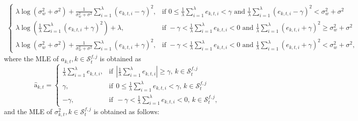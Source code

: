 \documentclass[onecolumn]{IEEEtran}
\begin{document}
\begin{align}
\begin{cases}
     \lambda \log(\sigma_w^2 + \sigma^2) + \frac{1}{\sigma_w^2 + \sigma^2} \sum_{i=1}^{\lambda} (e_{k,t,i} - \gamma)^2, & \mbox{if } 0 \leq \frac{1}{\lambda} \sum_{i=1}^{\lambda} e_{k,t,i} < \gamma \mbox{ and } \frac{1}{\lambda} \sum_{i=1}^{\lambda} (e_{k,t,i} - \gamma)^2 < \sigma_w^2 + \sigma^2 \\
     \lambda \log(\frac{1}{\lambda} \sum_{i=1}^{\lambda} (e_{k,t,i} + \gamma)^2) + \lambda, & \mbox{if } -\gamma < \frac{1}{\lambda} \sum_{i=1}^{\lambda} e_{k,t,i} < 0 \mbox{ and } \frac{1}{\lambda} \sum_{i=1}^{\lambda} (e_{k,t,i} + \gamma)^2 \geq \sigma_w^2 + \sigma^2 \\
     \lambda \log(\sigma_w^2 + \sigma^2) + \frac{1}{\sigma_w^2 + \sigma^2} \sum_{i=1}^{\lambda} (e_{k,t,i} + \gamma)^2, & \mbox{if } -\gamma < \frac{1}{\lambda} \sum_{i=1}^{\lambda} e_{k,t,i} < 0 \mbox{ and } \frac{1}{\lambda} \sum_{i=1}^{\lambda} (e_{k,t,i} + \gamma)^2 < \sigma_w^2 + \sigma^2,
   \end{cases}
\end{align}
where the MLE of $a_{k,t}, k \in \mathcal{S}_t^{f,j}$ is obtained as
\begin{equation} \label{eq:a_hat_kt_v2}
    \hat{\mathrm{a}}_{k,t} =
    \begin{cases}
     \frac{1}{\lambda} \sum_{i=1}^{\lambda} e_{k,t,i} , & \text{if} ~~ |\frac{1}{\lambda} \sum_{i=1}^{\lambda} e_{k,t,i}| \geq \gamma, \, k \in \mathcal{S}_t^{f,j} \\
     \gamma , & \text{if} ~~ 0 \leq \frac{1}{\lambda} \sum_{i=1}^{\lambda} e_{k,t,i} < \gamma, \, k \in \mathcal{S}_t^{f,j} \\
     - \gamma , & \text{if} ~~ - \gamma < \frac{1}{\lambda} \sum_{i=1}^{\lambda} e_{k,t,i} < 0, \, k \in \mathcal{S}_t^{f,j},
    \end{cases}
\end{equation}
and the MLE of $\sigma_{k,t}^2, k \in \mathcal{S}_t^{f,j}$ is obtained as follows:
\end{document}
